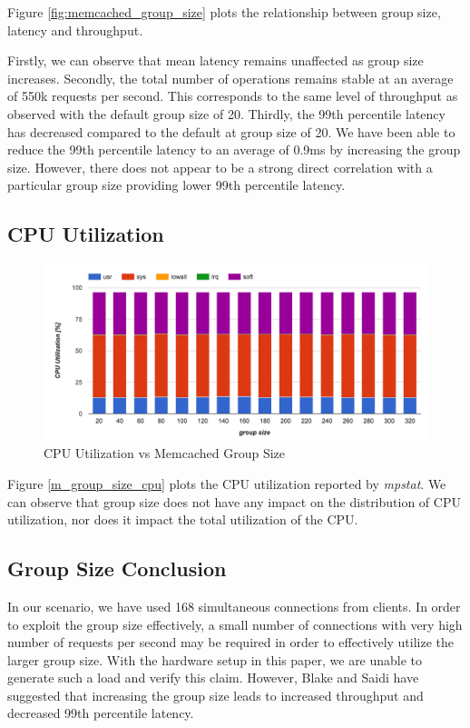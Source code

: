 Figure \ref{fig:memcached_group_size} plots the relationship between group size, latency and throughput.

Firstly, we can observe that mean latency remains unaffected as group size increases.
Secondly, the total number of operations remains stable at an average of 550k requests per second. This corresponds to the same level of throughput as observed with the default group size of 20.
Thirdly, the 99th percentile latency has decreased compared to the default at group size of 20. We have been able to reduce the 99th percentile latency to an average of 0.9ms by increasing the group size. However, there does not appear to be a strong direct correlation with a particular group size providing lower 99th percentile latency.

\subsection{CPU Utilization}

\begin{figure}[h]
    \includegraphics[width=\textwidth]{./res2/m_group_size_cpu.png}
    \caption{CPU Utilization vs Memcached Group Size}
    \label{fig:m_group_size_cpu}
\end{figure}

Figure \ref{m_group_size_cpu} plots the CPU utilization reported by \textit{mpstat}. We can observe that group size does not have any impact on the distribution of CPU utilization, nor does it impact the total utilization of the CPU.

\subsection{Group Size Conclusion}

In our scenario, we have used 168 simultaneous connections from clients. In order to exploit the group size effectively, a small number of connections with very high number of requests per second may be required in order to effectively utilize the larger group size. With the hardware setup in this paper, we are unable to generate such a load and verify this claim. However, Blake and Saidi \cite{blake54does} have suggested that increasing the group size leads to increased throughput and decreased 99th percentile latency.



